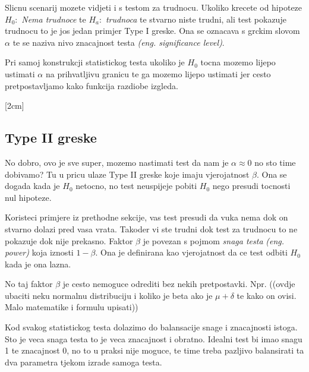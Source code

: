 Slicnu scenarij mozete vidjeti i s testom za trudnocu. Ukoliko krecete od hipoteze  $H_0:$ \emph{Nema trudnoce} te $H_a:$ \emph{trudnoca} te stvarno niste trudni, ali test pokazuje trudnocu to je jos jedan primjer Type I greske. Ona se oznacava s grckim slovom $\alpha$ te se naziva nivo znacajnost testa \textit{(eng. significance level)}.

Pri samoj konstrukcji statistickog testa ukoliko je $H_0$ tocna mozemo lijepo ustimati $\alpha$ na prihvatljivu granicu te ga mozemo lijepo ustimati jer cesto pretpostavljamo kako funkcija razdiobe izgleda. 

[2cm]

\subsection{Type II greske}

No dobro, ovo je sve super, mozemo nastimati test da nam je $\alpha \approx 0$ no sto time dobivamo? Tu u pricu ulaze Type II greske koje imaju vjerojatnost $\beta$. Ona se dogada kada je $H_0$ netocno, no test neuspijeje pobiti $H_0$ nego presudi tocnosti nul hipoteze.

Koristeci primjere iz prethodne sekcije, vas test presudi da vuka nema dok on stvarno dolazi pred vasa vrata. Takoder vi ste trudni dok test za trudnocu to ne pokazuje dok nije prekasno. Faktor $\beta$ je povezan s pojmom \emph{snaga testa} \textit{(eng. power)} koja iznosti $1-\beta$. Ona je definirana kao vjerojatnost da ce test odbiti $H_0$ kada je ona lazna. 

No taj faktor $\beta$ je cesto nemoguce odrediti bez nekih pretpostavki. Npr. ((ovdje ubaciti neku normalnu distribuciju i koliko je beta ako je $\mu  + \delta$ te kako on ovisi. Malo matematike i formulu upisati))

Kod svakog statistickog testa dolazimo do balansacije snage i znacajnosti istoga. Sto je veca snaga testa to je veca znacajnost i obratno. Idealni test bi imao snagu 1 te znacajnost 0, no to u praksi nije moguce, te time treba pazljivo balansirati ta dva parametra tjekom izrade samoga testa.



